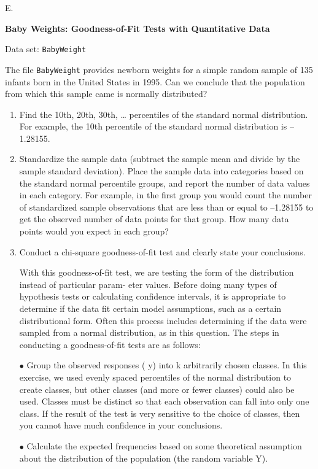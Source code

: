 \documentclass[
]{report}
\newcounter{excount}
\renewcommand{\theexcount}{E\arabic{excount}}
\begin{document}
\begin{list}{\theexcount.}{ \setlength{\itemsep}{0.5em}}
  \item \textbf{Baby Weights: Goodness-of-Fit Tests with Quantitative Data}    

  Data set: \texttt{BabyWeight}    
  
  The file \texttt{BabyWeight} provides newborn weights for a simple random sample of 135 infants born in the United States in 1995. Can we conclude that the population from which this sample came is normally distributed?  
  \begin{enumerate}
    \item Find the 10th, 20th, 30th, … percentiles of the standard normal distribution. For example, the 10th percentile of the standard normal distribution is –1.28155.
    \item Standardize the sample data (subtract the sample mean and divide by the sample standard deviation). Place the sample data into categories based on the standard normal percentile groups, and report the number of data values in each category. For example, in the first group you would count the number of standardized sample observations that are less than or equal to –1.28155 to get the observed number of data points for that group. How many data points would you expect in each group?
    \item Conduct a chi-square goodness-of-fit test and clearly state your conclusions.
    
    With this goodness-of-fit test, we are testing the form of the distribution instead of particular param-
eter values. Before doing many types of hypothesis tests or calculating confidence intervals, it is
appropriate to determine if the data fit certain model assumptions, such as a certain distributional
form. Often this process includes determining if the data were sampled from a normal distribution, as
in this question. The steps in conducting a goodness-of-fit tests are as follows:
  
  $\bullet$ Group the observed responses ( y) into k arbitrarily chosen classes. In this exercise, we used evenly
  spaced percentiles of the normal distribution to create classes, but other classes (and more or fewer
  classes) could also be used. Classes must be distinct so that each observation can fall into only one
  class. If the result of the test is very sensitive to the choice of classes, then you cannot have much
  confidence in your conclusions.
  
  $\bullet$ Calculate the expected frequencies based on some theoretical assumption about the distribution of
  the population (the random variable Y).
  

\end{enumerate}
\end{list}
\end{document}
